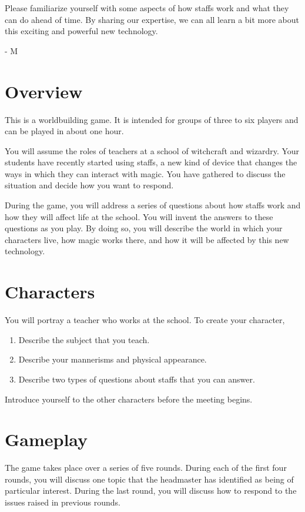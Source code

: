 \documentclass[a6paper, 11pt, parskip=half, DIV=15]{scrartcl}
\begin{document}
Please familiarize yourself with some aspects of how staffs work and what they can do ahead of time.
By sharing our expertise, we can all learn a bit more about this exciting and powerful new technology.

\hspace{4.5cm}\huge- M
\setmainfont{URW Classico}
\normalsize

\newpage
\enlargethispage{3.5\baselineskip}

\section*{Overview}
This is a worldbuilding game. It is intended for groups of three to six players and can be played in about one hour.

You will assume the roles of teachers at a school of witchcraft and wizardry. Your students have recently started using staffs, a new kind of device that changes the ways in which they can interact with magic. You have gathered to discuss the situation and decide how you want to respond.

During the game, you will address a series of questions about how staffs work and how they will affect life at the school. You will invent the answers to these questions as you play. By doing so, you will describe the world in which your characters live, how magic works there, and how it will be affected by this new technology.

\newpage
\enlargethispage{3.5\baselineskip}

\section*{Characters}
You will portray a teacher who works at the school. To create your character,
\begin{enumerate}[nosep]
	\item Describe the subject that you teach.
	\item Describe your mannerisms and physical appearance.
	\item Describe two types of questions about staffs that you can answer.
\end{enumerate}
Introduce yourself to the other characters before the meeting begins.

\section*{Gameplay}
The game takes place over a series of five rounds. 
During each of the first four rounds, you will discuss one topic that the headmaster has identified as being of particular interest.
During the last round, you will discuss how to respond to the issues raised in previous rounds. 
\end{document}
